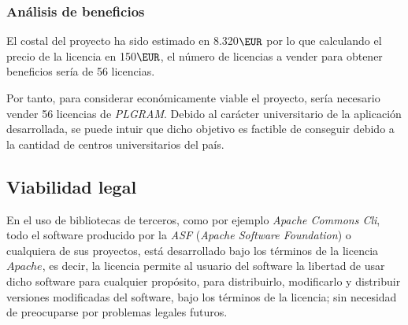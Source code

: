 \subsubsection{Análisis de beneficios}

El costal del proyecto ha sido estimado en 8.320$\EUR$ por lo que calculando el precio de la licencia en 150$\EUR$, el número de licencias a vender para obtener beneficios sería de 56 licencias.

Por tanto, para considerar económicamente viable el proyecto, sería necesario vender 56 licencias de \textit{PLGRAM}. Debido al carácter universitario de la aplicación desarrollada, se puede intuir que dicho objetivo es factible de conseguir debido a la cantidad de centros universitarios del país.

\subsection{Viabilidad legal}

En el uso de bibliotecas de terceros, como por ejemplo \textit{Apache Commons Cli}, todo el software producido por la \textit{ASF} (\textit{Apache Software Foundation}) o cualquiera de sus proyectos, está desarrollado bajo los términos de la licencia $Apache$, es decir, la licencia permite al usuario del software la libertad de usar dicho software para cualquier propósito, para distribuirlo, modificarlo y distribuir versiones modificadas del software, bajo los términos de la licencia; sin necesidad de preocuparse por problemas legales futuros\cite{apache}.

